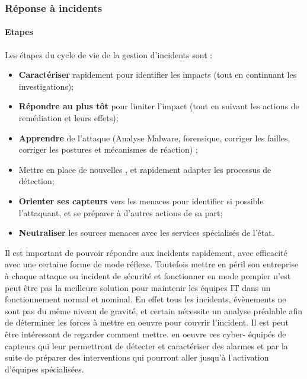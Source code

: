\begin{frame}
\frametitle<presentation>{Réponse à incidents}
\framesubtitle<presentation>{Etapes}
Les étapes du cycle de vie de la gestion d'incidents sont :

\begin{itemize}
  \item \textbf{Caractériser} rapidement pour identifier les impacts (tout en continuant les investigations);
  \item \textbf{Répondre au plus tôt} pour limiter l'impact (tout en suivant les actions de remédiation et leurs effets);
  \item \textbf{Apprendre} de l'attaque (Analyse Malware, forensique, corriger les failles, corriger les postures et mécanismes de réaction) ;
  \item Mettre en place de nouvelles , et rapidement adapter les processus de détection;
  \item \textbf{Orienter ses capteurs } vers les menaces pour identifier si possible l'attaquant, et se préparer à d'autres actions de sa part;
  \item \textbf{Neutraliser} les sources menaces avec les services spécialisés de l'état.
\end{itemize}
\end{frame}

Il est important de pouvoir répondre aux incidents rapidement, avec efficacité avec une certaine forme de mode réflexe. Toutefois mettre en péril son entreprise à chaque attaque ou incident de sécurité et fonctionner en mode pompier n'est peut être pas la meilleure  solution pour maintenir les équipes IT dans un fonctionnement normal et nominal. En effet tous les incidents, évènements ne sont pas du même niveau de gravité, et certain nécessite un analyse préalable afin de déterminer les forces à mettre en oeuvre pour couvrir l'incident. Il est peut être intéressant de regarder comment mettre. en oeuvre ces cyber- équipés de capteurs qui leur permettront de détecter et caractériser des alarmes et par la suite de préparer des interventions qui pourront aller jusqu'à l'activation d'équipes spécialisées.


